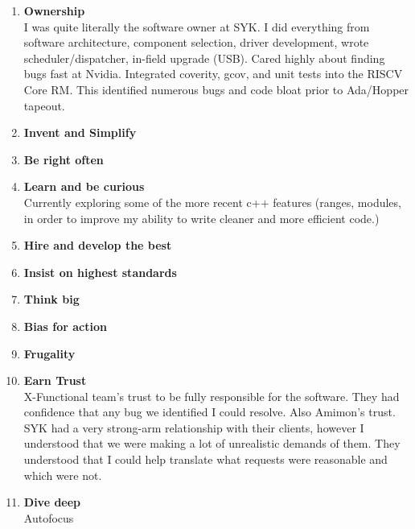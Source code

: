 \documentclass{article}
\begin{document}
\begin{itemize}
\begin{enumerate}
			\item \textbf{Ownership }\\
				I was quite literally the software owner at SYK. I did everything from software architecture, component selection, driver development, wrote scheduler/dispatcher, in-field upgrade (USB).
				Cared highly about finding bugs fast at Nvidia. Integrated coverity, gcov, and unit tests into the RISCV Core RM. This identified numerous bugs and code bloat prior to Ada/Hopper tapeout.
			\item \textbf{Invent and Simplify }\\
			\item \textbf{Be right often }\\ 
			
			\item \textbf{Learn and be curious }\\
				Currently exploring some of the more recent c++ features (ranges, modules, in order to improve my ability to write cleaner and more efficient code.)
			\item \textbf{Hire and develop the best}
			\item \textbf{Insist on highest standards }\\
			\item \textbf{Think big}
			\item \textbf{Bias for action }\\
			\item \textbf{Frugality}
			\item \textbf{Earn Trust }\\
				X-Functional team's trust to be fully responsible for the software. They had confidence that any bug we identified I could resolve.
				Also Amimon's trust. SYK had a very strong-arm relationship with their clients, however I understood that we were making a lot of unrealistic demands of them. They understood that I could help translate what requests were reasonable and which were not.
			\item \textbf{Dive deep }\\
			Autofocus 
		\end{enumerate}
\end{itemize}
\end{document}
